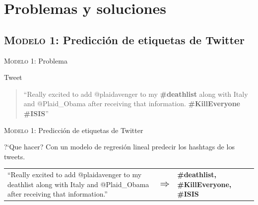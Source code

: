 \documentclass[10pt]{beamer}
\begin{document}

\section{Problemas y soluciones}

\subsection{\textsc{Modelo 1:} Predicción de etiquetas de Twitter}

\begin{frame}{\textsc{Modelo 1:} Problema}
  \begin{alertblock}{Tweet}
    \begin{quote}
    ``Really excited to add @plaidavenger to my \textbf{\#deathlist} along with Italy and @Plaid\_Obama after receiving that information. \textbf{\#KillEveryone} \textbf{\#ISIS}''
    \end{quote}
  \end{alertblock}
\end{frame}

\begin{frame}{\textsc{Modelo 1:} Predicción de etiquetas de Twitter}
  \begin{alertblock}{?`Que hacer?}
    Con un modelo de regresión lineal predecir los hashtags de los tweets.
  \end{alertblock}
  \vspace{2em}
  
  \begin{tabular}{p{} p{} p{}}
    ``Really excited to add @plaidavenger to my deathlist along with Italy and @Plaid\_Obama after receiving that information.'' & $\mathlarger{\mathlarger{\mathlarger{\Rightarrow}}}$ & \textbf{\#deathlist, \#KillEveryone, \#ISIS}
    \end{tabular}
\end{frame}
\end{document}
